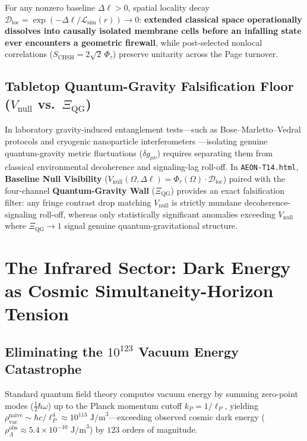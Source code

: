 \documentclass[11pt,a4paper]{article}
\begin{document}
For any nonzero baseline $\Delta\ell > 0$, spatial locality decay $\mathcal{D}_{\mathrm{loc}} = \exp(-\Delta\ell / \mathcal{L}_{\mathrm{sim}}(r)) \to 0$: \textbf{extended classical space operationally dissolves into causally isolated membrane cells before an infalling state ever encounters a geometric firewall}, while post-selected nonlocal correlations ($S_{\mathrm{CHSH}} = 2\sqrt{2}\,\Phi_\tau$) preserve unitarity across the Page turnover.

\subsection{Tabletop Quantum-Gravity Falsification Floor ($V_{\mathrm{null}}$ vs.\ $\Xi_{\mathrm{QG}}$)}
In laboratory gravity-induced entanglement tests---such as Bose--Marletto--Vedral protocols \cite{bose2017,mv2017} and cryogenic nanoparticle interferometers \cite{diosi1989,penrose1996}---isolating genuine quantum-gravity metric fluctuations ($\delta g_{\mu\nu}$) requires separating them from classical environmental decoherence and signaling-lag roll-off. In \texttt{AEON-T14.html}, \textbf{Baseline Null Visibility} ($V_{\mathrm{null}}(\Omega, \Delta\ell) = \Phi_\tau(\Omega) \cdot \mathcal{D}_{\mathrm{loc}}$) paired with the four-channel \textbf{Quantum-Gravity Wall} ($\Xi_{\mathrm{QG}}$) provides an exact falsification filter: any fringe contrast drop matching $V_{\mathrm{null}}$ is strictly mundane decoherence-signaling roll-off, whereas only statistically significant anomalies exceeding $V_{\mathrm{null}}$ where $\Xi_{\mathrm{QG}} \to 1$ signal genuine quantum-gravitational structure.

\section{The Infrared Sector: Dark Energy as Cosmic Simultaneity-Horizon Tension}

\subsection{Eliminating the $10^{123}$ Vacuum Energy Catastrophe}
Standard quantum field theory computes vacuum energy by summing zero-point modes ($\frac{1}{2}\hbar\omega$) up to the Planck momentum cutoff $k_P = 1/\ell_P$, yielding $\rho_{\mathrm{vac}}^{\mathrm{naive}} \sim \hbar c / \ell_P^4 \approx 10^{113}\text{ J/m}^3$---exceeding observed cosmic dark energy ($\rho_\Lambda^{\mathrm{obs}} \approx 5.4 \times 10^{-10}\text{ J/m}^3$) by $123$ orders of magnitude.
\end{document}
